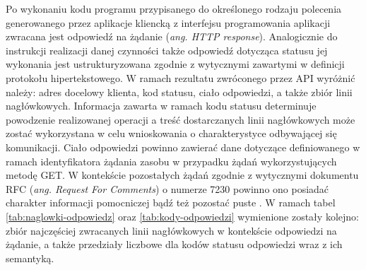 Po wykonaniu kodu programu przypisanego do określonego rodzaju polecenia generowanego przez aplikacje kliencką z interfejsu programowania aplikacji zwracana jest odpowiedź na żądanie (\textit{ang. HTTP response}). Analogicznie do instrukcji realizacji danej czynności także odpowiedź dotycząca statusu jej wykonania jest ustrukturyzowana zgodnie z wytycznymi zawartymi w definicji protokołu hipertekstowego. W ramach rezultatu zwróconego przez API wyróżnić należy: adres docelowy klienta, kod statusu, ciało odpowiedzi, a także zbiór linii nagłówkowych. Informacja zawarta w ramach kodu statusu determinuje powodzenie realizowanej operacji a treść dostarczanych linii nagłówkowych może zostać wykorzystana w celu wnioskowania o charakterystyce odbywającej się komunikacji. Ciało odpowiedzi powinno zawierać dane dotyczące definiowanego w ramach identyfikatora żądania zasobu w przypadku żądań wykorzystujących metodę GET. W kontekście pozostałych żądań zgodnie z wytycznymi dokumentu RFC (\textit{ang. Request For Comments}) o numerze 7230 powinno ono posiadać charakter informacji pomocniczej bądź też pozostać puste \cite{rfc7230}. W ramach tabel \ref{tab:naglowki-odpowiedz} oraz \ref{tab:kody-odpowiedzi} wymienione zostały kolejno: zbiór najczęściej zwracanych linii nagłówkowych w kontekście odpowiedzi na żądanie, a także przedziały liczbowe dla kodów statusu odpowiedzi wraz z ich semantyką.

